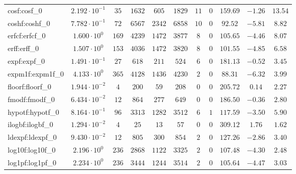 \begin{tabular}{|l|c|c|c|c|c|c|c|c|c|c|}
cosf:cosf\_0                 & $ 2.192 \cdot 10^{-1} $ & $ 35     $ & $ 1632   $ & $ 605   $ & $ 1829   $ & $ 11  $ & $ 0 $ & $ 159.69      $ & $ -1.26   $ & $ 13.54   $ \\
coshf:coshf\_0               & $ 7.782 \cdot 10^{-1} $ & $ 72     $ & $ 6567   $ & $ 2342  $ & $ 6858   $ & $ 10  $ & $ 0 $ & $ 92.52       $ & $ -5.81   $ & $ 8.82    $ \\
erfcf:erfcf\_0               & $ 1.600 \cdot 10^{0}  $ & $ 169    $ & $ 4239   $ & $ 1472  $ & $ 3877   $ & $ 8   $ & $ 0 $ & $ 105.65      $ & $ -4.46   $ & $ 8.07    $ \\
erff:erff\_0                 & $ 1.507 \cdot 10^{0}  $ & $ 153    $ & $ 4036   $ & $ 1472  $ & $ 3820   $ & $ 8   $ & $ 0 $ & $ 101.55      $ & $ -4.85   $ & $ 6.58    $ \\
expf:expf\_0                 & $ 1.491 \cdot 10^{-1} $ & $ 27     $ & $ 618    $ & $ 211   $ & $ 524    $ & $ 6   $ & $ 0 $ & $ 181.13      $ & $ -0.52   $ & $ 3.45    $ \\
expm1f:expm1f\_0             & $ 4.133 \cdot 10^{0}  $ & $ 365    $ & $ 4128   $ & $ 1436  $ & $ 4230   $ & $ 2   $ & $ 0 $ & $ 88.31       $ & $ -6.32   $ & $ 3.99    $ \\
floorf:floorf\_0             & $ 1.944 \cdot 10^{-2} $ & $ 4      $ & $ 200    $ & $ 59    $ & $ 208    $ & $ 0   $ & $ 0 $ & $ 205.72      $ & $ 0.14    $ & $ 2.27    $ \\
fmodf:fmodf\_0               & $ 6.434 \cdot 10^{-2} $ & $ 12     $ & $ 864    $ & $ 277   $ & $ 649    $ & $ 0   $ & $ 0 $ & $ 186.50      $ & $ -0.36   $ & $ 2.80    $ \\
hypotf:hypotf\_0             & $ 8.164 \cdot 10^{-1} $ & $ 96     $ & $ 3313   $ & $ 1282  $ & $ 3512   $ & $ 6   $ & $ 1 $ & $ 117.59      $ & $ -3.50   $ & $ 5.90    $ \\
ilogbf:ilogbf\_0             & $ 1.294 \cdot 10^{-2} $ & $ 4      $ & $ 25     $ & $ 13    $ & $ 57     $ & $ 0   $ & $ 0 $ & $ 309.12      $ & $ 1.76    $ & $ 1.62    $ \\
ldexpf:ldexpf\_0             & $ 9.430 \cdot 10^{-2} $ & $ 12     $ & $ 805    $ & $ 300   $ & $ 854    $ & $ 2   $ & $ 0 $ & $ 127.26      $ & $ -2.86   $ & $ 3.40    $ \\
log10f:log10f\_0             & $ 2.196 \cdot 10^{0}  $ & $ 236    $ & $ 2868   $ & $ 1122  $ & $ 3325   $ & $ 2   $ & $ 0 $ & $ 107.48      $ & $ -4.30   $ & $ 2.48    $ \\
log1pf:log1pf\_0             & $ 2.234 \cdot 10^{0}  $ & $ 236    $ & $ 3444   $ & $ 1244  $ & $ 3514   $ & $ 2   $ & $ 0 $ & $ 105.64      $ & $ -4.47   $ & $ 3.03    $ \\

\end{tabular}
